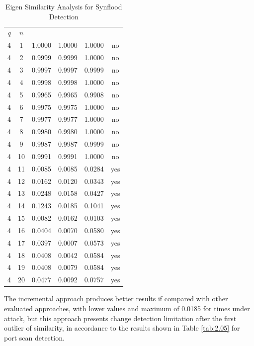 \begin{table}[h!]
  \centering
  \footnotesize
  \caption{Eigen Similarity Analysis for Synflood Detection}
  \label{tab:2.06}
  \begin{tabular}{ c c c c c c }
	\toprule
	\multirow{2}{*}{\pmb{Time Frame} $q$} &\multirow{2}{*}{\pmb{Time} $n$}   &\multicolumn{3}{c}{\pmb{Similarity Analysis}} &\multirow{2}{*}{\pmb{Ground Truth}}\\ 
			\hhline{~~---~}
			& &\pmb{Incremental Individualized} &\pmb{Incremental} &\pmb{Individual}\\
	\midrule
	4 &1 &1.0000 &1.0000 &1.0000 &no \\
	4 &2 &0.9999 &0.9999 &1.0000 &no \\
	4 &3 &0.9997 &0.9997 &0.9999 &no \\
	4 &4 &0.9998 &0.9998 &1.0000 &no \\
	4 &5 &0.9965 &0.9965 &0.9908 &no \\
	4 &6 &0.9975 &0.9975 &1.0000 &no \\
	4 &7 &0.9977 &0.9977 &1.0000 &no \\
	4 &8 &0.9980 &0.9980 &1.0000 &no \\
	4 &9 &0.9987 &0.9987 &0.9999 &no \\
	4 &10 &0.9991 &0.9991 &1.0000 &no \\
	4 &11 &0.0085 &0.0085 &0.0284 &yes \\
	4 &12 &0.0162 &0.0120 &0.0343 &yes \\
	4 &13 &0.0248 &0.0158 &0.0427 &yes \\
	4 &14 &0.1243 &0.0185 &0.1041 &yes \\
	4 &15 &0.0082 &0.0162 &0.0103 &yes \\
	4 &16 &0.0404 &0.0070 &0.0580 &yes \\
	4 &17 &0.0397 &0.0007 &0.0573 &yes \\
	4 &18 &0.0408 &0.0042 &0.0584 &yes \\
	4 &19 &0.0408 &0.0079 &0.0584 &yes \\
	4 &20 &0.0477 &0.0092 &0.0757 &yes \\
    \bottomrule
  \end{tabular}
\end{table}

The incremental approach produces better results if compared with other evaluated approaches, with lower values and maximum of 0.0185 for times under attack, but this approach presents change detection limitation after the first outlier of similarity, in accordance to the results shown in Table \ref{tab:2.05} for port scan detection. 

